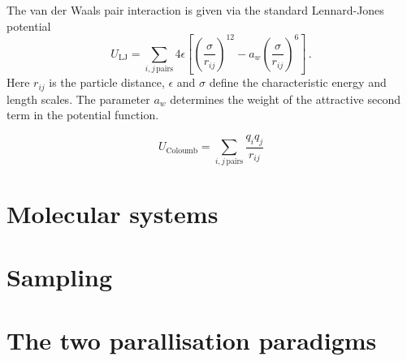 \documentclass[11pt]{article}
\begin{document}
The van der Waals pair interaction is given via the standard Lennard-Jones
potential 
\begin{equation}
  U_\mathrm{LJ} =  \sum_{i,j \, \mathrm{pairs}}
  4\epsilon\left[\left(\frac{\sigma}{r_{ij}}\right)^{12} - a_w
    \left(\frac{\sigma}{r_{ij}}\right)^{6}\right] \, .
\end{equation}
Here $r_{ij}$ is the particle distance, $\epsilon$ and $\sigma$ define the
characteristic energy and length scales. The parameter $a_w$ determines the
weight of the attractive second term in the potential function.


\begin{equation}
  U_{\mathrm{Coloumb}} = \sum_{i,j \, \mathrm{pairs}}\frac{q_iq_j}{r_{ij}}
\end{equation}



\section{Molecular systems}
\section{Sampling}
\section{The two parallisation paradigms}
\end{document}
